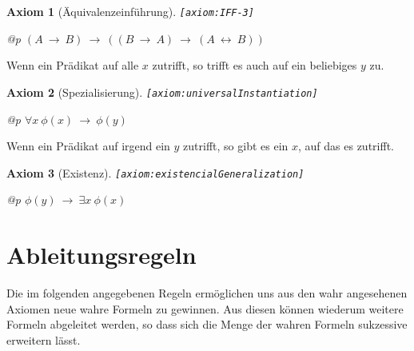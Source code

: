 \documentclass[a4paper,german,10pt,twoside]{book}
\newtheorem{ax}{Axiom}
\theoremstyle{definition}
\theoremstyle{remark}
\begin{document}
\begin{ax}[{\"A}quivalenzeinf{\"u}hrung]
\label{axiom:IFF-3} \hypertarget{axiom:IFF-3}{}
{\tt \tiny [\verb]axiom:IFF-3]]}
\mbox{}
\begin{longtable}{{@{\extracolsep{\fill}}p{\linewidth}}}
\centering $(A\ \rightarrow\ B)\ \rightarrow\ ((B\ \rightarrow\ A)\ \rightarrow\ (A\ \leftrightarrow\ B))$
\end{longtable}

\end{ax}


\par
Wenn ein Pr{\"a}dikat auf alle $x$ zutrifft, so trifft es auch auf ein beliebiges $y$ zu.

\begin{ax}[Spezialisierung]
\label{axiom:universalInstantiation} \hypertarget{axiom:universalInstantiation}{}
{\tt \tiny [\verb]axiom:universalInstantiation]]}
\mbox{}
\begin{longtable}{{@{\extracolsep{\fill}}p{\linewidth}}}
\centering $\forall x\ \phi(x)\ \rightarrow\ \phi(y)$
\end{longtable}

\end{ax}


\par
Wenn ein Pr{\"a}dikat auf irgend ein $y$ zutrifft, so gibt es ein $x$, auf das es zutrifft.

\begin{ax}[Existenz]
\label{axiom:existencialGeneralization} \hypertarget{axiom:existencialGeneralization}{}
{\tt \tiny [\verb]axiom:existencialGeneralization]]}
\mbox{}
\begin{longtable}{{@{\extracolsep{\fill}}p{\linewidth}}}
\centering $\phi(y)\ \rightarrow\ \exists x\ \phi(x)$
\end{longtable}

\end{ax}


\section{Ableitungsregeln} \label{chapter3_section2} \hypertarget{chapter3_section2}{}
Die im folgenden angegebenen Regeln erm{\"o}glichen uns aus den wahr angesehenen Axiomen neue wahre Formeln zu gewinnen. Aus diesen k{\"o}nnen wiederum weitere Formeln abgeleitet werden, so dass sich die Menge der wahren Formeln sukzessive erweitern l{\"a}sst.
\end{document}
